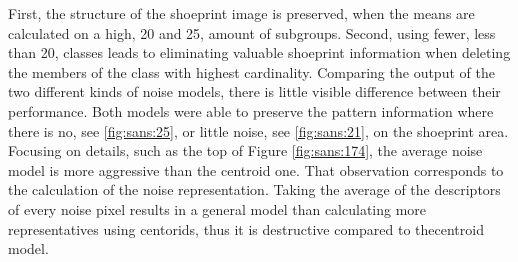 \documentclass[draft,final]{vutinfth} %
\begin{document}
First, the structure of the shoeprint image is preserved, when the means are calculated on a high, 20 and 25, amount of subgroups.
Second, using fewer, less than 20, classes leads to eliminating valuable shoeprint information when deleting the members of the class with highest cardinality.
Comparing the output of the two different kinds of noise models, there is little visible difference between their performance.
Both models were able to preserve the pattern information where there is no, see  \ref{fig:sans:25}, or little noise, see  \ref{fig:sans:21}, on the shoeprint area.
Focusing on details, such as the top of Figure \ref{fig:sans:174}, the average noise model is more aggressive than the centroid one. 
That observation corresponds to the calculation of the noise representation.
Taking the average of the descriptors of every noise pixel results in a general model than calculating more representatives using centorids, thus it is destructive compared to thecentroid model.
\end{document}
